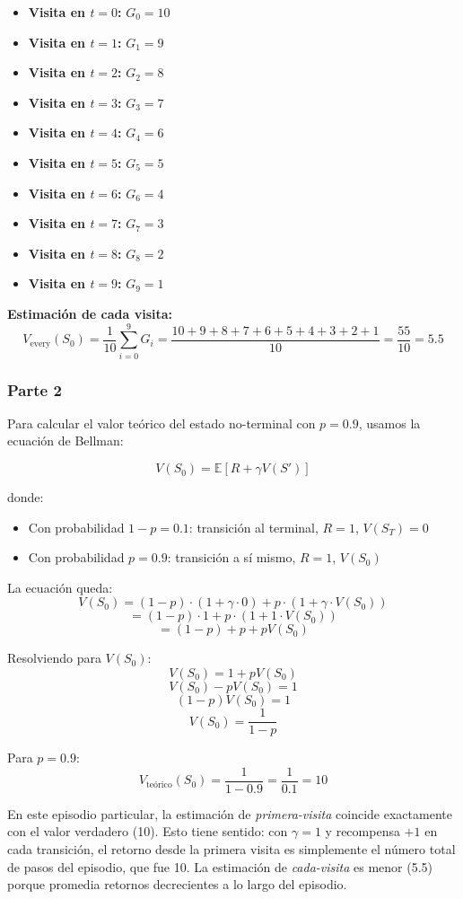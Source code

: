 \documentclass[12pt,a4paper]{article}
\begin{document}
\begin{itemize}
    \item \textbf{Visita en $t=0$:} $G_0 = 10$
    \item \textbf{Visita en $t=1$:} $G_1 = 9$
    \item \textbf{Visita en $t=2$:} $G_2 = 8$
    \item \textbf{Visita en $t=3$:} $G_3 = 7$
    \item \textbf{Visita en $t=4$:} $G_4 = 6$
    \item \textbf{Visita en $t=5$:} $G_5 = 5$
    \item \textbf{Visita en $t=6$:} $G_6 = 4$
    \item \textbf{Visita en $t=7$:} $G_7 = 3$
    \item \textbf{Visita en $t=8$:} $G_8 = 2$
    \item \textbf{Visita en $t=9$:} $G_9 = 1$
\end{itemize}

\textbf{Estimación de cada visita:}
$$V_{\text{every}}(S_0) = \frac{1}{10}\sum_{i=0}^{9} G_i = \frac{10 + 9 + 8 + 7 + 6 + 5 + 4 + 3 + 2 + 1}{10} = \frac{55}{10} = 5.5$$

\subsubsection{Parte 2}

Para calcular el valor teórico del estado no-terminal con $p = 0.9$, usamos la ecuación de Bellman:

$$V(S_0) = \mathbb{E}[R + \gamma V(S')]$$

donde:
\begin{itemize}
    \item Con probabilidad $1-p = 0.1$: transición al terminal, $R=1$, $V(S_T) = 0$
    \item Con probabilidad $p = 0.9$: transición a sí mismo, $R=1$, $V(S_0)$
\end{itemize}

La ecuación queda:
$$V(S_0) = (1-p) \cdot (1 + \gamma \cdot 0) + p \cdot (1 + \gamma \cdot V(S_0))$$
$$= (1-p) \cdot 1 + p \cdot (1 + 1 \cdot V(S_0))$$
$$= (1-p) + p + pV(S_0)$$

Resolviendo para $V(S_0)$:
$$V(S_0) = 1 + pV(S_0)$$
$$V(S_0) - pV(S_0) = 1$$
$$(1-p)V(S_0) = 1$$
$$V(S_0) = \frac{1}{1-p}$$

Para $p = 0.9$:
$$V_{\text{teórico}}(S_0) = \frac{1}{1-0.9} = \frac{1}{0.1} = 10$$


En este episodio particular, la estimación de \textit{primera-visita} coincide 
exactamente con el valor verdadero (10). Esto tiene sentido: con $\gamma = 1$ y 
recompensa $+1$ en cada transición, el retorno desde la primera visita es simplemente 
el número total de pasos del episodio, que fue 10. La estimación de \textit{cada-visita} 
es menor (5.5) porque promedia retornos decrecientes a lo largo del episodio.
\end{document}
